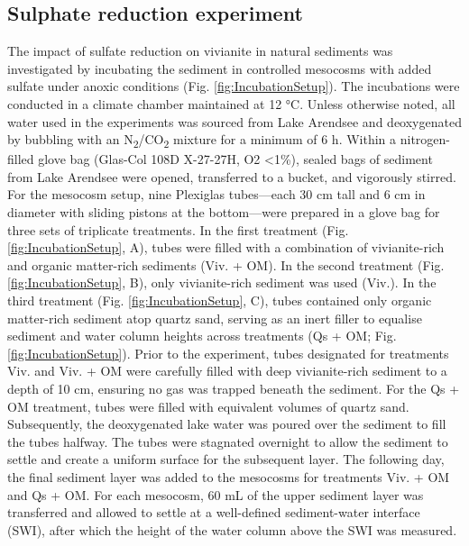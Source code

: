 \documentclass[12pt,twoside]{book}
\begin{document}
\subsection{Sulphate reduction experiment}\label{sulphate-reduction-experiment}

The impact of sulfate reduction on vivianite in natural sediments was investigated by incubating the sediment in controlled mesocosms with added sulfate under anoxic conditions (Fig. \ref{fig:IncubationSetup}). The incubations were conducted in a climate chamber maintained at 12 °C. Unless otherwise noted, all water used in the experiments was sourced from Lake Arendsee and deoxygenated by bubbling with an N\textsubscript{2}/CO\textsubscript{2} mixture for a minimum of 6 h. Within a nitrogen-filled glove bag (Glas-Col 108D X-27-27H, O2 \textless1\%), sealed bags of sediment from Lake Arendsee were opened, transferred to a bucket, and vigorously stirred.
For the mesocosm setup, nine Plexiglas tubes---each 30 cm tall and 6 cm in diameter with sliding pistons at the bottom---were prepared in a glove bag for three sets of triplicate treatments. In the first treatment (Fig. \ref{fig:IncubationSetup}, A), tubes were filled with a combination of vivianite-rich and organic matter-rich sediments (Viv. + OM). In the second treatment (Fig. \ref{fig:IncubationSetup}, B), only vivianite-rich sediment was used (Viv.). In the third treatment (Fig. \ref{fig:IncubationSetup}, C), tubes contained only organic matter-rich sediment atop quartz sand, serving as an inert filler to equalise sediment and water column heights across treatments (Qs + OM; Fig. \ref{fig:IncubationSetup}).
Prior to the experiment, tubes designated for treatments Viv. and Viv. + OM were carefully filled with deep vivianite-rich sediment to a depth of 10 cm, ensuring no gas was trapped beneath the sediment. For the Qs + OM treatment, tubes were filled with equivalent volumes of quartz sand. Subsequently, the deoxygenated lake water was poured over the sediment to fill the tubes halfway. The tubes were stagnated overnight to allow the sediment to settle and create a uniform surface for the subsequent layer. The following day, the final sediment layer was added to the mesocosms for treatments Viv. + OM and Qs + OM. For each mesocosm, 60 mL of the upper sediment layer was transferred and allowed to settle at a well-defined sediment-water interface (SWI), after which the height of the water column above the SWI was measured.
\end{document}

